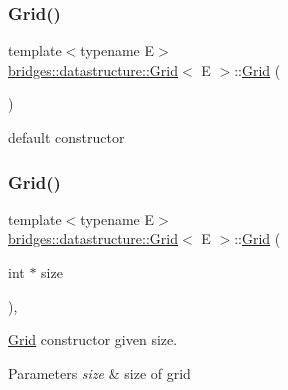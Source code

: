 \subsubsection{\texorpdfstring{Grid()}{Grid()}\hspace{0.1cm}{\footnotesize\ttfamily [2/4]}}
{\footnotesize\ttfamily template$<$typename E$>$ \\
\hyperlink{classbridges_1_1datastructure_1_1_grid}{bridges\+::datastructure\+::\+Grid}$<$ E $>$\+::\hyperlink{classbridges_1_1datastructure_1_1_grid}{Grid} (\begin{DoxyParamCaption}{ }\end{DoxyParamCaption})\hspace{0.3cm}{\ttfamily [inline]}}

default constructor \mbox{\label{classbridges_1_1datastructure_1_1_grid_ad47ddbed7bbd07f98aaa61b74fcf826c}} 
\subsubsection{\texorpdfstring{Grid()}{Grid()}\hspace{0.1cm}{\footnotesize\ttfamily [3/4]}}
{\footnotesize\ttfamily template$<$typename E$>$ \\
\hyperlink{classbridges_1_1datastructure_1_1_grid}{bridges\+::datastructure\+::\+Grid}$<$ E $>$\+::\hyperlink{classbridges_1_1datastructure_1_1_grid}{Grid} (\begin{DoxyParamCaption}\item[{int $\ast$}]{size }\end{DoxyParamCaption})\hspace{0.3cm}{\ttfamily [inline]}, {\ttfamily [explicit]}}



\hyperlink{classbridges_1_1datastructure_1_1_grid}{Grid} constructor given size. 


\begin{DoxyParams}{Parameters}
{\em size} & size of grid \\
\hline
\end{DoxyParams}
\mbox{\label{classbridges_1_1datastructure_1_1_grid_afc81003993a30d1112d2dff71bfc191b}} 
